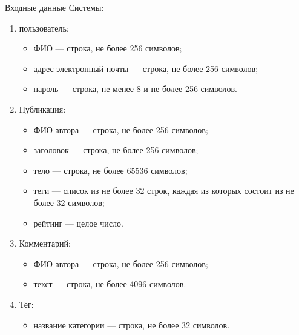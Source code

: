 \documentclass{bmstu-gost-7-32}
\begin{document}
Входные данные Системы:
\begin{enumerate}
	\item пользователь:
	\begin{itemize}
		\item ФИО — строка, не более 256 символов;
		\item адрес электронный почты — строка, не более 256 символов;
		\item пароль — строка, не менее 8 и не более 256 символов.
	\end{itemize}
	\item Публикация:
	\begin{itemize}
		\item ФИО автора — строка, не более 256 символов;
		\item заголовок — строка, не более 256 символов;
		\item тело — строка, не более 65536 символов;
		\item теги — список из не более 32 строк, каждая из которых состоит из не более 32 символов;
		\item рейтинг — целое число.
	\end{itemize}
	\item Комментарий:
	\begin{itemize}
		\item ФИО автора — строка, не более 256 символов;
		\item текст — строка, не более 4096 символов.
	\end{itemize}
	\item Тег:
	\begin{itemize}
		\item название категории — строка, не более 32 символов.
	\end{itemize}
\end{enumerate}
\end{document}
